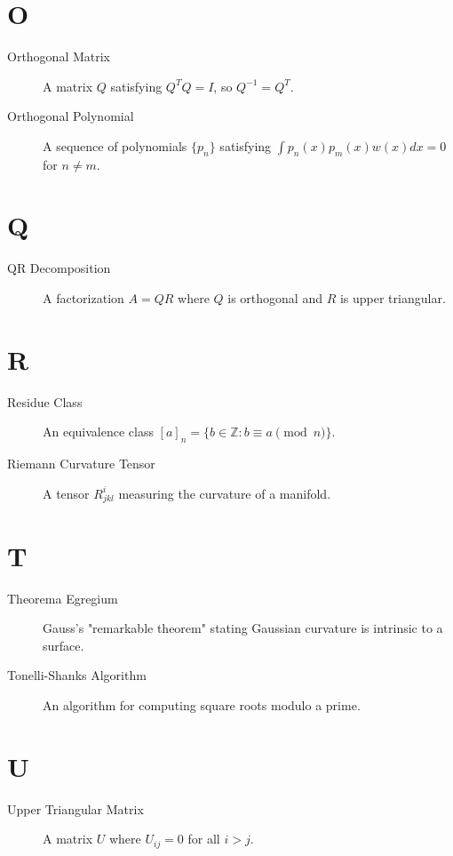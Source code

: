 \section*{O}
\begin{description}
\item[Orthogonal Matrix] A matrix $Q$ satisfying $Q^TQ = I$, so $Q^{-1} = Q^T$.
\item[Orthogonal Polynomial] A sequence of polynomials $\{p_n\}$ satisfying $\int p_n(x)p_m(x)w(x)dx = 0$ for $n \neq m$.
\end{description}

\section*{Q}
\begin{description}
\item[QR Decomposition] A factorization $A = QR$ where $Q$ is orthogonal and $R$ is upper triangular.
\end{description}

\section*{R}
\begin{description}
\item[Residue Class] An equivalence class $[a]_n = \{b \in \mathbb{Z} : b \equiv a \pmod{n}\}$.
\item[Riemann Curvature Tensor] A tensor $R^i_{jkl}$ measuring the curvature of a manifold.
\end{description}

\section*{T}
\begin{description}
\item[Theorema Egregium] Gauss's "remarkable theorem" stating Gaussian curvature is intrinsic to a surface.
\item[Tonelli-Shanks Algorithm] An algorithm for computing square roots modulo a prime.
\end{description}

\section*{U}
\begin{description}
\item[Upper Triangular Matrix] A matrix $U$ where $U_{ij} = 0$ for all $i > j$.
\end{description}

\printindex
